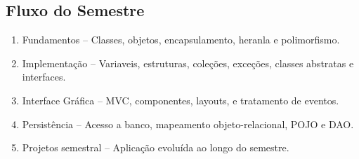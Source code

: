 \documentclass[12pt]{article}
\begin{document}
    \subsection{Fluxo do Semestre}
    \begin{enumerate}
        \item Fundamentos -- Classes, objetos, encapsulamento, heranla e 
        polimorfismo.
        \item Implementação -- Variaveis, estruturas, coleções, exceções, 
        classes abstratas e interfaces.
        \item Interface Gráfica -- MVC, componentes, layouts, e tratamento de 
        eventos.
        \item Persistência -- Acesso a banco, mapeamento objeto-relacional, 
        POJO e DAO.
        \item Projetos semestral -- Aplicação evoluída ao longo do semestre.
    \end{enumerate}
\end{document}
